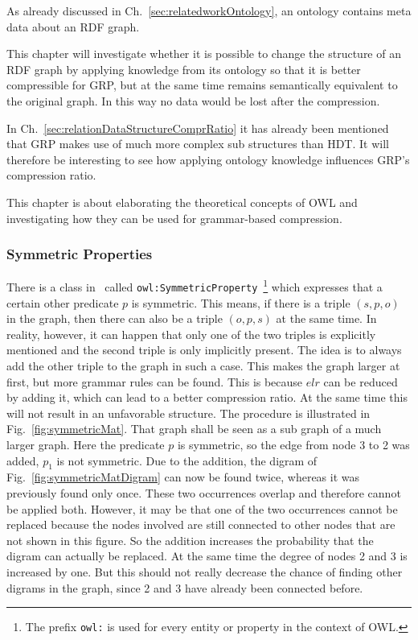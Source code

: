As already discussed in Ch.~\ref{sec:relatedworkOntology}, an ontology contains meta data about an RDF graph.

This chapter will investigate whether it is possible to change the structure of an RDF graph by applying knowledge from its ontology so that it is better compressible for GRP, but at the same time remains semantically equivalent to the original graph. In this way no data would be lost after the compression.

In Ch.~\ref{sec:relationDataStructureComprRatio} it has already been mentioned that GRP makes use of much more complex sub structures than HDT. It will therefore be interesting to see how applying ontology knowledge influences GRP's compression ratio.

This chapter is about elaborating the theoretical concepts of OWL and investigating how they can be used for grammar-based compression.

\subsubsection{Symmetric Properties}


There is a class in~\cite{owl} called {\tt owl:SymmetricProperty}~\footnote{The prefix {\tt owl:} is used for every entity or property in the context of OWL.} which expresses that a certain other predicate $p$ is symmetric. This means, if there is a triple $(s,p,o)$ in the graph, then there can also be a triple $(o,p,s)$ at the same time. In reality, however, it can happen that only one of the two triples is explicitly mentioned and the second triple is only implicitly present. The idea is to always add the other triple to the graph in such a case. This makes the graph larger at first, but more grammar rules can be found. This is because $elr$ can be reduced by adding it, which can lead to a better compression ratio. At the same time this will not result in an unfavorable structure. The procedure is illustrated in Fig.~\ref{fig:symmetricMat}. That graph shall be seen as a sub graph of a much larger graph. Here the predicate $p$ is symmetric, so the edge from node 3 to 2 was added, $p_1$ is not symmetric. Due to the addition, the digram of Fig.~\ref{fig:symmetricMatDigram} can now be found twice, whereas it was previously found only once. These two occurrences overlap and therefore cannot be applied both. However, it may be that one of the two occurrences cannot be replaced because the nodes involved are still connected to other nodes that are not shown in this figure. So the addition increases the probability that the digram can actually be replaced. At the same time the degree of nodes 2 and 3 is increased by one. But this should not really decrease the chance of finding other digrams in the graph, since 2 and 3 have already been connected before.


